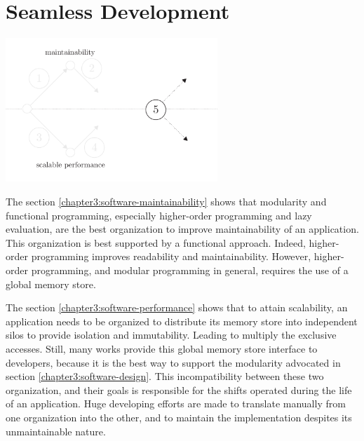 \section{Seamless Development} \label{chapter3:objectives}



\begin{center}
\includegraphics[width=0.6\textwidth]{../ressources/state-of-the-art-5.pdf}
\end{center}


The section \ref{chapter3:software-maintainability} shows that modularity and functional programming, especially higher-order programming and lazy evaluation, are the best organization to improve maintainability of an application.
This organization is best supported by a functional approach.
Indeed, higher-order programming improves readability and maintainability.
However, higher-order programming, and modular programming in general, requires the use of a global memory store.

The section \ref{chapter3:software-performance} shows that to attain scalability, an application needs to be organized to distribute its memory store into independent silos to provide isolation and immutability. Leading to multiply the exclusive accesses.
Still, many works provide this global memory store interface to developers, because it is the best way to support the modularity advocated in section \ref{chapter3:software-design}.
This incompatibility between these two organization, and their goals is responsible for the shifts operated during the life of an application.
Huge developing efforts are made to translate manually from one organization into the other, and to maintain the implementation despites its unmaintainable nature.

